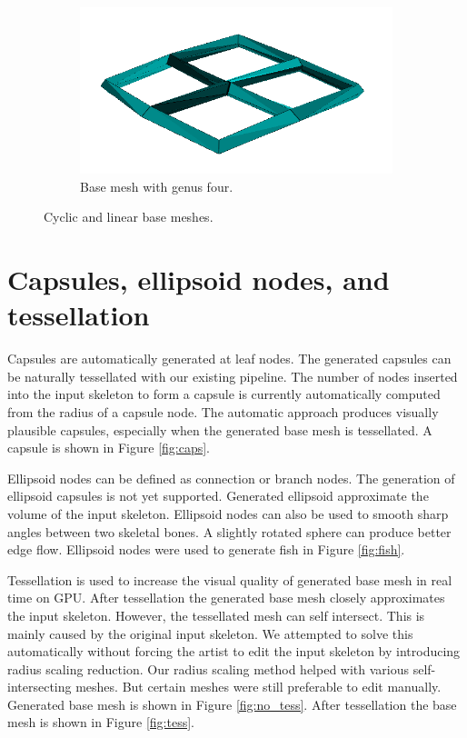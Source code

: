 \begin{figure}[h]
        \begin{subfigure}[b]{0.5\textwidth}
        	\centering
                \includegraphics[width=\textwidth]{images/cycle_mesh.png}
                \caption{Base mesh with genus four.}
                \label{fig:cyclic_mesh}
        \end{subfigure}
        \caption[Cyclic and linear base meshes]{Cyclic and linear base meshes.}\label{fig:pavuk}
\end{figure}

\section{Capsules, ellipsoid nodes, and tessellation}

Capsules are automatically generated at leaf nodes.
The generated capsules can be naturally tessellated with our existing pipeline.
The number of nodes inserted into the input skeleton to form a capsule is currently automatically computed from the radius of a capsule node.
The automatic approach produces visually plausible capsules, especially when the generated base mesh is tessellated.
A capsule is shown in Figure \ref{fig:caps}.

Ellipsoid nodes can be defined as connection or branch nodes.
The generation of ellipsoid capsules is not yet supported.
Generated ellipsoid approximate the volume of the input skeleton.
Ellipsoid nodes can also be used to smooth sharp angles between two skeletal bones.
A slightly rotated sphere can produce better edge flow.
Ellipsoid nodes were used to generate fish in Figure \ref{fig:fish}.

Tessellation is used to increase the visual quality of generated base mesh in real time on GPU.
After tessellation the generated base mesh closely approximates the input skeleton.
However, the tessellated mesh can self intersect.
This is mainly caused by the original input skeleton.
We attempted to solve this automatically without forcing the artist to edit the input skeleton by introducing radius scaling reduction.
Our radius scaling method helped with various self-intersecting meshes.
But certain meshes were still preferable to edit manually.
Generated base mesh is shown in Figure \ref{fig:no_tess}.
After tessellation the base mesh is shown in Figure \ref{fig:tess}.

